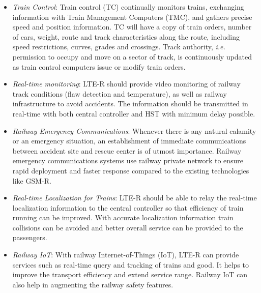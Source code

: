 \begin{itemize}
\item \textit{Train Control}: Train control (TC) continually monitors trains, exchanging information with Train Management Computers (TMC), and gathers precise speed and position information. TC will have a copy of train orders, number of cars, weight, route and track characteristics along the route, including speed restrictions, curves, grades and crossings. Track authority, \textit{i.e.} permission to occupy and move on a sector of track, is continuously updated as train control computers issue or modify train orders.

\item \textit{Real-time monitoring}: LTE-R should provide video monitoring of railway track conditions (flaw detection and temperature), as well as railway infrastructure to avoid accidents. The information should be transmitted in real-time with both central controller and HST with minimum delay possible. 

\item \textit{Railway Emergency Communications}: Whenever there is any natural calamity or an emergency situation, an establishment of immediate communications between accident site and rescue center is of utmost importance. Railway emergency communications systems use railway private network to ensure rapid deployment and faster response compared to the existing technologies like GSM-R. 

\item \textit{Real-time Localization for Trains}: LTE-R should be able to relay the real-time localization information to the central controller so that efficiency of train running can be improved. With accurate localization information train collisions can be avoided and better overall service can be provided to the passengers.

\item \textit{Railway IoT}: With railway Internet-of-Things (IoT), LTE-R can provide services such as real-time query and tracking of trains and good. It helps to improve the transport efficiency and extend service range. Railway IoT can also help in augmenting the railway safety features.
\end{itemize}

